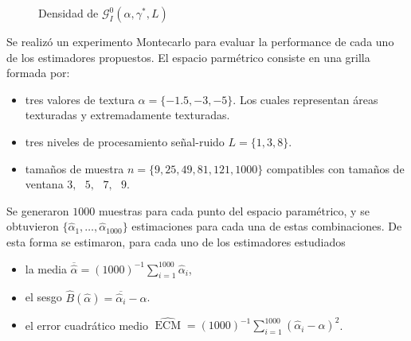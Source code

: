 \begin{figure}[H]
	\centering
	\caption{\label{densidades}\small Densidad de $\mathcal{G}_I^0(\alpha,\gamma^*,L)$}
\end{figure}


Se realizó un experimento Montecarlo para evaluar la performance de cada uno de los estimadores propuestos. El espacio parmétrico consiste en una grilla formada por:
\begin{itemize}
	\item tres valores de textura $\alpha=\{-1.5,-3,-5\}$. Los cuales representan áreas texturadas y extremadamente texturadas.
	\item tres niveles de procesamiento señal-ruido $L=\{1,3,8\}$.
	\item tamaños de muestra $n=\{9,25,49,81,121,1000\}$ compatibles con tamaños de ventana $3,\text{ }5,\text{ }7,\text{ }9$.
\end{itemize}

Se generaron $1000$ muestras para cada punto del espacio paramétrico, y se obtuvieron $\{\widehat{\alpha}_1, \dots, \widehat{\alpha}_{1000}\}$ estimaciones para cada una de estas combinaciones. De esta forma se estimaron, para cada uno de los estimadores estudiados
\begin{itemize}
	\label{ExperimentoMontecarlo}
	\item la media $\overline{\widehat{\alpha}}=(1000)^{-1}{\sum_{i=1}^{1000}{\widehat{\alpha}_i}}$,
	\item el sesgo  $\widehat{B}(\widehat\alpha) = \overline{\widehat\alpha_i}- \alpha$.
	 \item el error cuadrático medio $\widehat{\operatorname{ECM}}=({1000})^{-1}{\sum_{i=1}^{1000}{(\widehat{\alpha}_i-\alpha)^2}}$.
\end{itemize}
  
